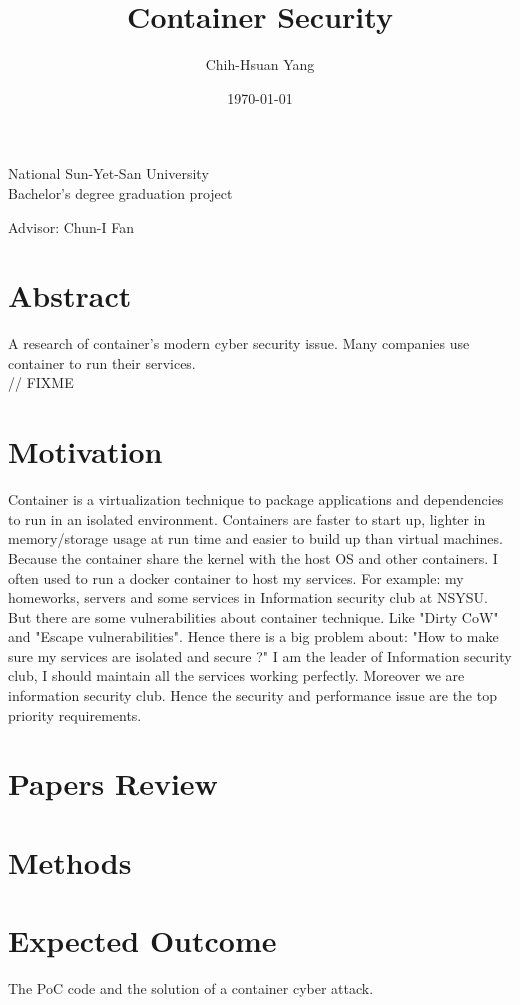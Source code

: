 \documentclass[12pt,a4paper,oneside,draft]{article}
\title{{\mytitle Container Security}}
\author{Chih-Hsuan Yang}
\date{\today}
\begin{document}
\maketitle
\begin{center}
    \begin{large}
        National Sun-Yet-San University \\
        Bachelor's degree graduation project \\
    \end{large}
    Advisor: Chun-I Fan
\end{center}

\newpage

\tableofcontents
\newpage

\section{Abstract}
A research of container's modern cyber security issue.
Many companies use container to run their services.\\
// FIXME

\section{Motivation}

Container is a virtualization technique to package applications and dependencies to run in
an isolated environment. Containers are faster to start up, lighter in memory/storage usage
at run time and easier to build up than virtual machines. Because the container share the
kernel with the host OS and other containers.
I often used to run a docker container to host my services. For example: my homeworks,
servers and some services in Information security club at NSYSU.
But there are some vulnerabilities about container technique. Like "Dirty CoW\cite{Dirty_CoW}"
and "Escape vulnerabilities".
Hence there is a big problem about: "How to make sure my services are isolated and secure
?" I am the leader of Information security club, I should maintain all the
services working perfectly. Moreover we are information security club. Hence the security
and performance issue are the top priority requirements.\\


\section{Papers Review}

\section{Methods}

\section{Expected Outcome}
The PoC code and the solution of a container cyber attack.

\printbibheading[heading=bibnumbered]
\printbibliography
\end{document}
